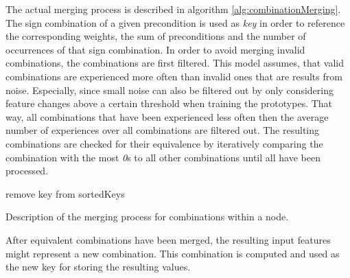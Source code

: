 The actual merging process is described in algorithm \ref{alg:combinationMerging}. The sign combination of a given precondition is used as \textit{key} in order to reference the corresponding weights, the sum of preconditions and the number of occurrences of that sign combination. 
In order to avoid merging invalid combinations, the combinations are first filtered. This model assumes, that valid combinations are experienced more often than invalid ones that are results from noise. 
Especially, since small noise can also be filtered out by only considering feature changes above a certain threshold when training the prototypes. That way, all combinations that have been experienced less often then the average number of experiences over all combinations are filtered out. 
The resulting combinations are checked for their equivalence by iteratively comparing the combination with the most \textit{0}s to all other combinations until all have been processed.

\begin{algorithm}[H]
\begin{algorithmic}[1]
	
	\Statex
				\State remove key from sortedKeys
			\EndIf
		\EndFor
	\EndWhile
\end{algorithmic}
\caption{Description of the merging process for combinations within a node.}
\label{alg:combinationMerging}
\end{algorithm}

After equivalent combinations have been merged, the resulting input features might represent a new combination. This combination is computed and used as the new key for storing the resulting values. 




